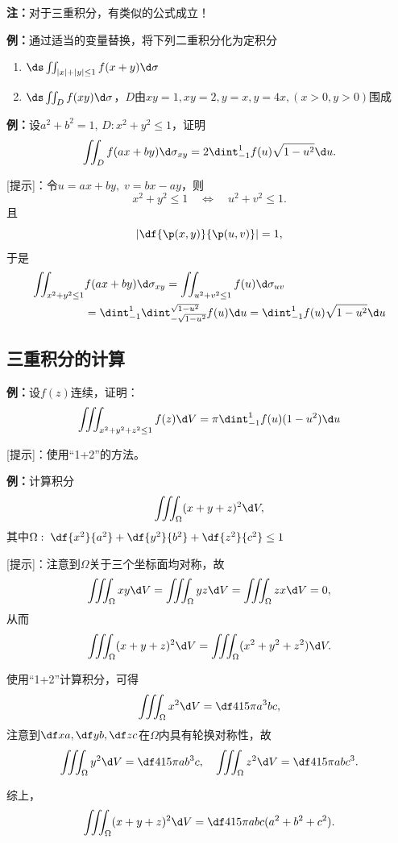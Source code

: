 {\bf 注：}对于三重积分，有类似的公式成立！

{\bf 例：}通过适当的变量替换，将下列二重积分化为定积分 
\begin{enumerate}[(1)]
  \setlength{\itemindent}{1cm}
  \item $\ds\iint_{|x|+|y|\leq 1}f(x+y)\d\sigma$ 
  \item $\ds\iint_Df(xy)\d\sigma$，$D$由$xy=1,xy=2,y=x,y=4x,(x>0,y>0)$围成 
\end{enumerate}

{\bf 例：}设$a^2+b^2=1,\, D:x^2+y^2\leq 1$，证明
$$\iint_Df(ax+by)\d\sigma_{xy}=2\dint_{-1}^1f(u)\sqrt{1-u^2}\d u.$$

[提示]：令$u=ax+by,\;v=bx-ay$，则
$$x^2+y^2\leq 1\quad\Leftrightarrow\quad u^2+v^2\leq 1.$$
且
$$\left|\df{\p(x,y)}{\p(u,v)}\right|=1,$$
于是
\begin{align*}
	\iint_{x^2+y^2\leq 1}&f(ax+by)\d\sigma_{xy}
	=\iint_{u^2+v^2\leq 1}f(u)\d\sigma_{uv}\\
	&=\dint_{-1}^1\dint_{-\sqrt{1-u^2}}^{\sqrt{1-u^2}}f(u)\d u
	=\dint_{-1}^1f(u)\sqrt{1-u^2}\d u
\end{align*}

\subsection{三重积分的计算}

{\bf 例：}设$f(z)$连续，证明：
$$\iiint_{x^2+y^2+z^2\leq 1}f(z)\d V=\pi\dint_{-1}^1f(u)(1-u^2)\d u$$

[提示]：使用“1+2”的方法。

{\bf 例：}计算积分
$$\iiint_{\Omega}(x+y+z)^2\d V,$$
其中$\Omega:\;\df{x^2}{a^2}+\df{y^2}{b^2}+\df{z^2}{c^2}\leq 1$

[提示]：注意到$\Omega$关于三个坐标面均对称，故
$$\iiint_{\Omega}xy\d V=\iiint_{\Omega}yz\d V=\iiint_{\Omega}zx\d V=0,$$
从而
$$\iiint_{\Omega}(x+y+z)^2\d V=\iiint_{\Omega}(x^2+y^2+z^2)\d V.$$

使用“1+2”计算积分，可得
$$\iiint_{\Omega}x^2\d V=\df4{15}\pi a^3bc,$$
注意到$\df xa,\df yb,\df zc$在$\Omega$内具有轮换对称性，故
$$\iiint_{\Omega}y^2\d V=\df4{15}\pi ab^3c,\quad
\iiint_{\Omega}z^2\d V=\df4{15}\pi abc^3.$$

综上，
$$\iiint_{\Omega}(x+y+z)^2\d V=\df4{15}\pi abc(a^2+b^2+c^2).$$



